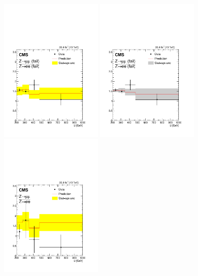 \begin{figure}
\centering
\includegraphics[width=0.45\textwidth]{figures/pullsImpact/ratio_zmm_fail_zee_fail_shapes_prefit.pdf}
\includegraphics[width=0.45\textwidth]{figures/pullsImpact/ratio_zmm_fail_zee_fail_shapes_fit_b.pdf}\\
\includegraphics[width=0.45\textwidth]{figures/pullsImpact/ratio_zmm_zee_shapes_prefit.pdf}

\end{figure}
